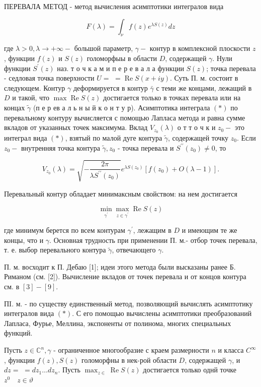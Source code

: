 \documentclass[10pt]{article}
\begin{document}
ПЕРЕВАЛА МЕТОД - метод вычисления асимптотики интегралов вида

\[
F(\lambda)=\int_{\nu} f(z) e^{\lambda S(z)} d z
\]

где $\lambda>0, \lambda \rightarrow+\infty-$ большой параметр, $\gamma-$ контур в комплексной плоскости $z$, функции $f(z)$ и $S(z)$ голоморфыы в области $D$, содержащей $\gamma$. Нули функции $S^{\prime}(z)$ наз. т о ч к а м и п е р е в а л а функции $S(z)$; точка перевала - седловая точка поверхности $U=$ $=\operatorname{Re} S(x+i y)$. Суть П. м. состоит в следующем. Контур $\gamma$ деформируется в контур $\bar{\gamma}$ с теми же концами, лежащий в $D$ и такой, что $\max \operatorname{Re} S(z)$ достигается только в точках перевала или на концах $\tilde{\gamma}$ (п е р ев а л ь н ы й к о н т у р). Асимптотика интеграла $(*)$ по перевальному контуру вычисляется с помощью Лапласа метода и равна сумме вкладов от указанных точек максимума. Вклад $V_{z_{0}}(\lambda)$ о т т о ч к и $z_{0}-$ это интеграл вида $(*)$, взятый по малой дуге контура $\tilde{\gamma}$, содержащей точку $z_{0}$. Если $z_{0}-$ внутренняя точка контура $\tilde{\gamma}, z_{0}$ - точка перевала и $S^{\prime \prime}\left(z_{0}\right) \neq 0$, то

\[
V_{z_{0}}(\lambda)=\sqrt{-\frac{2 \pi}{\lambda S^{\prime \prime}\left(z_{0}\right)}} e^{\lambda S\left(z_{0}\right)}\left[f\left(z_{0}\right)+O(\lambda-1)\right] .
\]

Перевальный контур обладает минимаксным свойством: на нем достигается

\[
\min _{\gamma^{\prime}} \max _{z \in \gamma^{\prime}} \operatorname{Re} S(z)
\]

где минимум берется по всем контурам $\gamma^{\prime}$, лежащим в $D$ и имеющим те же концы, что и $\gamma$. Основная трудность при применении П. м.- отбор точек перевала, т. е. выбор перевального контура $\tilde{\gamma}$, отвечающего $\gamma$.

П. м. восходит к П. Дебаю [1]; идеи этого метода были высказаны ранее Б. Риманом (см. [2]). Вычисление вкладов от точек перевала и от концов контура см. в $[3]-[9]$.

ПI. м. - по существу единственный метод, позволяющий вычислять асимптотику интегралов вида $(*)$. С его помощью вычислены асимптотики преобразований Лапласа, Фурье, Меллина, экспоненты от полинома, многих специальных функций.

Пусть $z \in \mathbb{C}^{n}, \gamma$ - ограниченное многообразие с краем размерности $n$ и класса $C^{\infty}$, функции $f(z), S(z)$ голоморфны в нек-рой области $D$, содержащей $\gamma$, и $d z=$ $=d z_{1} \ldots d z_{n}$. Пусть $\max _{z \in \mathcal{}} \operatorname{Re} S(z)$ достигается только однй точке $z^{0} \quad z \in \vartheta$
\end{document}
